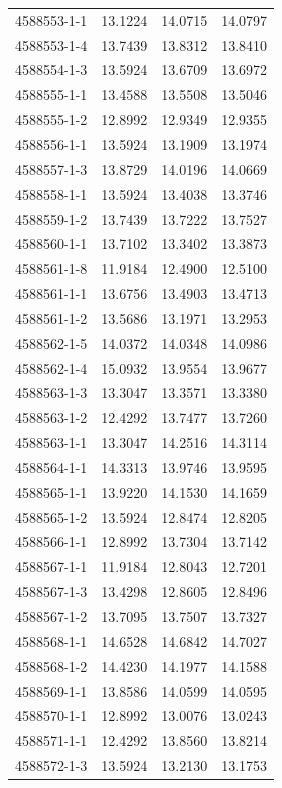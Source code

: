 \begin{longtable}{lrrr}
4588553-1-1 & 13.1224 & 14.0715 & 14.0797 \\
4588553-1-4 & 13.7439 & 13.8312 & 13.8410 \\
4588554-1-3 & 13.5924 & 13.6709 & 13.6972 \\
4588555-1-1 & 13.4588 & 13.5508 & 13.5046 \\
4588555-1-2 & 12.8992 & 12.9349 & 12.9355 \\
4588556-1-1 & 13.5924 & 13.1909 & 13.1974 \\
4588557-1-3 & 13.8729 & 14.0196 & 14.0669 \\
4588558-1-1 & 13.5924 & 13.4038 & 13.3746 \\
4588559-1-2 & 13.7439 & 13.7222 & 13.7527 \\
4588560-1-1 & 13.7102 & 13.3402 & 13.3873 \\
4588561-1-8 & 11.9184 & 12.4900 & 12.5100 \\
4588561-1-1 & 13.6756 & 13.4903 & 13.4713 \\
4588561-1-2 & 13.5686 & 13.1971 & 13.2953 \\
4588562-1-5 & 14.0372 & 14.0348 & 14.0986 \\
4588562-1-4 & 15.0932 & 13.9554 & 13.9677 \\
4588563-1-3 & 13.3047 & 13.3571 & 13.3380 \\
4588563-1-2 & 12.4292 & 13.7477 & 13.7260 \\
4588563-1-1 & 13.3047 & 14.2516 & 14.3114 \\
4588564-1-1 & 14.3313 & 13.9746 & 13.9595 \\
4588565-1-1 & 13.9220 & 14.1530 & 14.1659 \\
4588565-1-2 & 13.5924 & 12.8474 & 12.8205 \\
4588566-1-1 & 12.8992 & 13.7304 & 13.7142 \\
4588567-1-1 & 11.9184 & 12.8043 & 12.7201 \\
4588567-1-3 & 13.4298 & 12.8605 & 12.8496 \\
4588567-1-2 & 13.7095 & 13.7507 & 13.7327 \\
4588568-1-1 & 14.6528 & 14.6842 & 14.7027 \\
4588568-1-2 & 14.4230 & 14.1977 & 14.1588 \\
4588569-1-1 & 13.8586 & 14.0599 & 14.0595 \\
4588570-1-1 & 12.8992 & 13.0076 & 13.0243 \\
4588571-1-1 & 12.4292 & 13.8560 & 13.8214 \\
4588572-1-3 & 13.5924 & 13.2130 & 13.1753 \\

\end{longtable}
